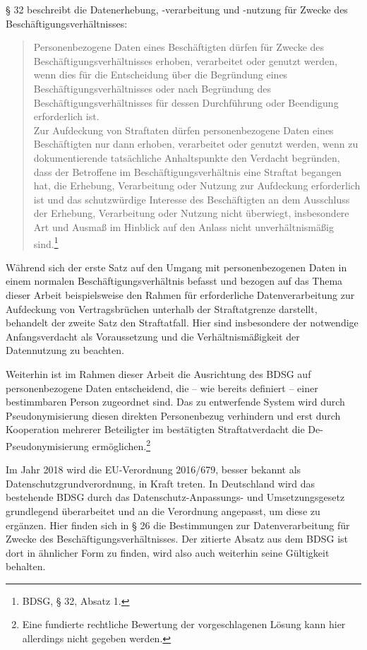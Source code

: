 § 32 beschreibt die Datenerhebung, -verarbeitung und -nutzung für Zwecke des Beschäftigungsverhältnisses:
\begin{quotation}
\glqq Personenbezogene Daten eines Beschäftigten dürfen für Zwecke des Beschäftigungsverhältnisses erhoben, verarbeitet oder genutzt werden, wenn dies für die Entscheidung über die Begründung eines Beschäftigungsverhältnisses oder nach Begründung des Beschäftigungsverhältnisses für dessen Durchführung oder Beendigung erforderlich ist.\\
Zur Aufdeckung von Straftaten dürfen personenbezogene Daten eines Beschäftigten nur dann erhoben, verarbeitet oder genutzt werden, wenn zu dokumentierende tatsächliche Anhaltspunkte den Verdacht begründen, dass der Betroffene im Beschäftigungsverhältnis eine Straftat begangen hat, die Erhebung, Verarbeitung oder Nutzung zur Aufdeckung erforderlich ist und das schutzwürdige Interesse des Beschäftigten an dem Ausschluss der Erhebung, Verarbeitung oder Nutzung nicht überwiegt, insbesondere Art und Ausmaß im Hinblick auf den Anlass nicht unverhältnismäßig sind.\grqq{}\footnote{
  BDSG, § 32, Absatz 1.
}
\end{quotation}

Während sich der erste Satz auf den Umgang mit personenbezogenen Daten in einem normalen Beschäftigungsverhältnis befasst und bezogen auf das Thema dieser Arbeit beispielsweise den Rahmen für erforderliche Datenverarbeitung zur Aufdeckung von Vertragsbrüchen unterhalb der Straftatgrenze darstellt, behandelt der zweite Satz den Straftatfall. Hier sind insbesondere der notwendige Anfangsverdacht als Voraussetzung und die Verhältnismäßigkeit der Datennutzung zu beachten. 

Weiterhin ist im Rahmen dieser Arbeit die Ausrichtung des BDSG auf personenbezogene Daten entscheidend, die -- wie bereits definiert -- einer bestimmbaren Person zugeordnet sind. Das zu entwerfende System wird durch Pseudonymisierung diesen direkten Personenbezug verhindern und erst durch Kooperation mehrerer Beteiligter im  bestätigten Straftatverdacht die De-Pseudonymisierung ermöglichen.\footnote{
  Eine fundierte rechtliche Bewertung der vorgeschlagenen Lösung kann hier allerdings nicht gegeben werden.
}

Im Jahr 2018 wird die EU-Verordnung 2016/679, besser bekannt als Datenschutzgrundverordnung, in Kraft treten. In Deutschland wird das bestehende BDSG durch das Datenschutz-Anpassungs- und Umsetzungsgesetz grundlegend überarbeitet und an die Verordnung angepasst, um diese zu ergänzen. Hier finden sich in § 26 die Bestimmungen zur Datenverarbeitung für Zwecke des Beschäftigungsverhältnisses. Der zitierte Absatz aus dem BDSG ist dort in ähnlicher Form zu finden, wird also auch weiterhin seine Gültigkeit behalten. 







